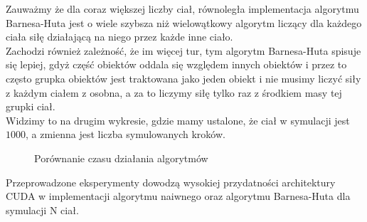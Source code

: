 \documentclass[14pt,twoside,a4paper]{article}
\theoremstyle{definition}
\begin{document}
Zauważmy że dla coraz większej liczby ciał, równoległa implementacja algorytmu Barnesa-Huta jest o wiele szybsza niż wielowątkowy algorytm liczący dla każdego ciała siłę działającą na niego przez każde inne ciało. \\
Zachodzi również zależność, że im więcej tur, tym algorytm Barnesa-Huta spisuje się lepiej, gdyż część obiektów oddala się względem innych obiektów i przez to często grupka obiektów jest traktowana jako jeden obiekt i nie musimy liczyć siły z każdym ciałem z osobna, a za to liczymy siłę tylko raz z środkiem masy tej grupki ciał.\\
Widzimy to na drugim wykresie, gdzie mamy ustalone, że ciał w symulacji jest $1000$, a zmienna jest liczba symulowanych kroków.
\begin{figure}[h]
\caption{Porównanie czasu działania algorytmów}
\end{figure}

Przeprowadzone eksperymenty dowodzą wysokiej przydatności architektury CUDA w implementacji algorytmu naiwnego oraz algorytmu Barnesa-Huta dla symulacji N ciał.
\newpage
\nocite{*}
\printbibliography%
\end{document}
